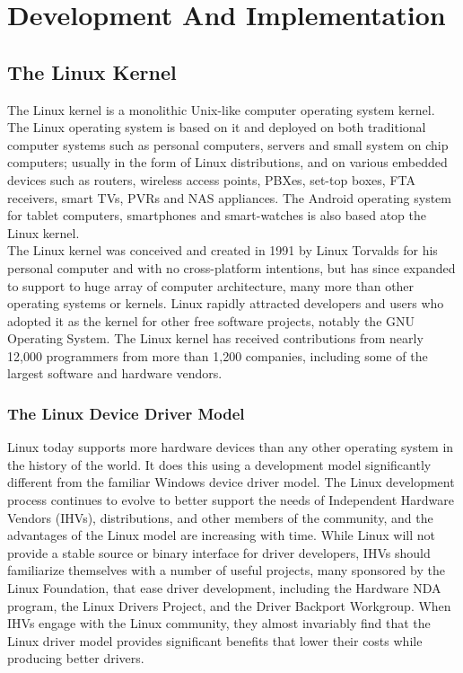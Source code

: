 \chapter{Development And Implementation}
\section{The Linux Kernel}
The Linux kernel is a monolithic Unix-like computer operating system kernel. The Linux operating system is based on it and deployed on both traditional computer systems such as personal computers, servers and small system on chip computers; usually in the form of Linux distributions, and on various embedded devices such as routers, wireless access points, PBXes, set-top boxes, FTA receivers, smart TVs, PVRs and NAS appliances. The Android operating system for tablet computers, smartphones and smart-watches is also based atop the Linux kernel.\\
The Linux kernel was conceived and created in 1991 by Linux Torvalds for his personal computer and with no cross-platform intentions, but has since expanded to support to huge array of computer architecture, many more than other operating systems or kernels. Linux rapidly attracted developers and users who adopted it as the kernel for other free software projects, notably the GNU Operating System. The Linux kernel has received contributions from nearly 12,000 programmers from more than 1,200 companies, including some of the largest software and hardware vendors.
\subsection{The Linux Device Driver Model}
Linux today supports more hardware devices than any other operating system in the history of the world. It does this using a development model significantly different from the familiar Windows device driver model. The Linux development process continues to evolve to better support the needs of Independent Hardware Vendors (IHVs), distributions, and other members of the community, and the advantages of the Linux model are increasing with time. While Linux will not provide a stable source or binary interface for driver developers, IHVs should familiarize themselves with a number of useful projects, many sponsored by the Linux Foundation, that ease driver development, including the Hardware NDA program, the Linux Drivers Project, and the Driver Backport Workgroup. When IHVs engage with the Linux community, they almost invariably find that the Linux driver model provides significant benefits that lower their costs while producing better drivers.

